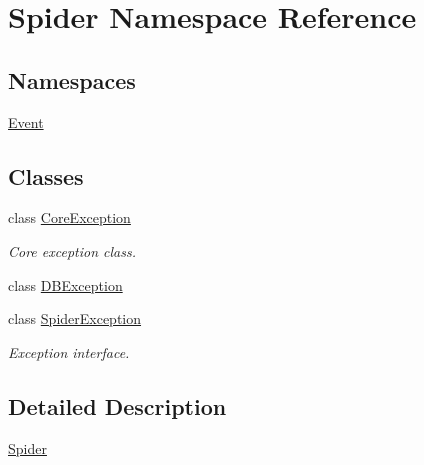 \hypertarget{namespace_spider}{}\section{Spider Namespace Reference}
\label{namespace_spider}
\subsection*{Namespaces}
\begin{DoxyCompactItemize}
\item 
 \hyperlink{namespace_spider_1_1_event}{Event}
\end{DoxyCompactItemize}
\subsection*{Classes}
\begin{DoxyCompactItemize}
\item 
class \hyperlink{class_spider_1_1_core_exception}{Core\+Exception}
\begin{DoxyCompactList}\small\item\em Core exception class. \end{DoxyCompactList}\item 
class \hyperlink{class_spider_1_1_d_b_exception}{D\+B\+Exception}
\item 
class \hyperlink{class_spider_1_1_spider_exception}{Spider\+Exception}
\begin{DoxyCompactList}\small\item\em Exception interface. \end{DoxyCompactList}\end{DoxyCompactItemize}


\subsection{Detailed Description}
\hyperlink{namespace_spider}{Spider} 